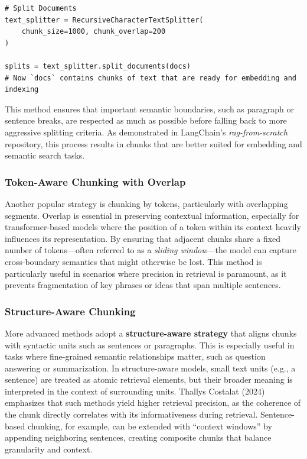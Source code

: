 \documentclass[twocolumn, 10pt]{article}
\begin{document}
\begin{lstlisting}[style=mypython]
# Split Documents
text_splitter = RecursiveCharacterTextSplitter(
    chunk_size=1000, chunk_overlap=200
)

splits = text_splitter.split_documents(docs)
# Now `docs` contains chunks of text that are ready for embedding and indexing
\end{lstlisting}

This method ensures that important semantic boundaries, such as paragraph or sentence breaks, are respected as much as possible before falling back to more aggressive splitting criteria. As demonstrated in LangChain’s \textit{rag-from-scratch} repository, this process results in chunks that are better suited for embedding and semantic search tasks.


\subsubsection{Token-Aware Chunking with Overlap}

Another popular strategy is chunking by tokens, particularly with overlapping segments. Overlap is essential in preserving contextual information, especially for transformer-based models where the position of a token within its context heavily influences its representation. By ensuring that adjacent chunks share a fixed number of tokens—often referred to as a \textit{sliding window}—the model can capture cross-boundary semantics that might otherwise be lost. This method is particularly useful in scenarios where precision in retrieval is paramount, as it prevents fragmentation of key phrases or ideas that span multiple sentences.

\subsubsection{Structure-Aware Chunking}

More advanced methods adopt a \textbf{structure-aware strategy} that aligns chunks with syntactic units such as sentences or paragraphs. This is especially useful in tasks where fine-grained semantic relationships matter, such as question answering or summarization. In structure-aware models, small text units (e.g., a sentence) are treated as atomic retrieval elements, but their broader meaning is interpreted in the context of surrounding units. Thallys Costalat (2024) emphasizes that such methods yield higher retrieval precision, as the coherence of the chunk directly correlates with its informativeness during retrieval. Sentence-based chunking, for example, can be extended with ``context windows'' by appending neighboring sentences, creating composite chunks that balance granularity and context.
\end{document}
